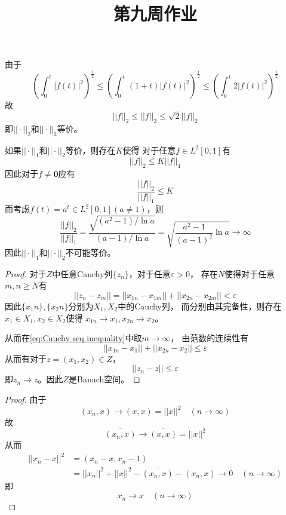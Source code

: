 \documentclass[cn]{homework}
\title{第九周作业}
\begin{document}
    \maketitle

    \problem
    由于
    \[\left(\int_0^t|f(t)|^2\right)^{\frac{1}{2}}
    \leq
    \left(\int_0^t(1+t)|f(t)|^2\right)^{\frac{1}{2}}
    \leq
    \left(\int_0^t2|f(t)|^2\right)^{\frac{1}{2}}\]
    故
    \[||f||_2\leq||f||_3\leq\sqrt{2}||f||_2\]
    即$||\cdot||_2$和$||\cdot||_3$等价。

    如果$||\cdot||_1$和$||\cdot||_2$等价，则存在$K$使得
    对于任意$f\in L^2[0,1]$有
    \[||f||_2\leq K||f||_1\]
    因此对于$f\neq \boldsymbol 0$应有
    \[\frac{||f||_2}{||f||_1}\leq K\]
    而考虑$f(t)=a^t\in L^2[0,1](a\neq 1)$，则
    \[\frac{||f||_2}{||f||_1}
    =\frac{\sqrt{(a^2-1)/\ln a}}{(a-1)/\ln a}
    =\sqrt{\frac{a^2-1}{(a-1)^2}\ln a}\to\infty\]
    因此$||\cdot||_1$和$||\cdot||_2$不可能等价。

    \problem
    \begin{proof}
        对于$Z$中任意Cauchy列$\{z_n\}$，对于任意$\varepsilon>0$，
        存在$N$使得对于任意$m,n\geq N$有
        \begin{equation}
            \label{eq:Cauchy seq inequality}
            ||z_n-z_m||=||x_{1n}-x_{1m}||+||x_{2n}-x_{2m}||
            <\varepsilon
        \end{equation}
        因此$\{x_1n\},\{x_2n\}$分别为$X_1,X_2$中的Cauchy列，
        而分别由其完备性，则存在$x_1\in X_1,x_2\in X_2$使得
        $x_{1n}\to x_1,x_{2n}\to x_2$。

        从而在\cref{eq:Cauchy seq inequality}中取$m\to\infty$，
        由范数的连续性有
        \[||x_{1n}-x_1||+||x_{2n}-x_2||\leq\varepsilon\]
        从而有对于$z=(x_1,x_2)\in Z$，
        \[||z_n-z||\leq\varepsilon\]
        即$z_n\to z$。因此$Z$是Banach空间。
    \end{proof}

    \problem

    \problem
    \begin{proof}
        由于
        \[(x_n,x)\to(x,x)=||x||^2\quad(n\to\infty)\]
        故
        \[\overline{(x_n,x)}\to\overline{(x,x)}=||x||^2\]
        从而
        \[\begin{aligned}
            ||x_n-x||^2&=(x_n-x,x_n-1)\\
            &=||x_n||^2+||x||^2-\overline{(x_n,x)}-(x_n,x)
            \to 0
            \quad(n\to\infty)
        \end{aligned}\]
        即
        \[x_n\to x\quad(n\to\infty)\]
    \end{proof}
\end{document}
